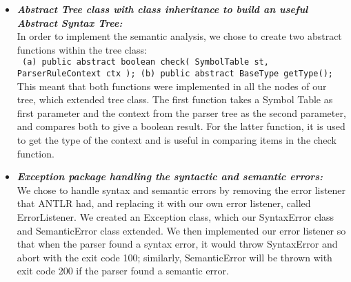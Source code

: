 \documentclass[a4paper]{article}
\theoremstyle{definition}
\begin{document}
\begin{itemize}
\item\textbf{\textit{Abstract Tree class with class inheritance to build an useful Abstract Syntax Tree:}}
\\
In order to implement the semantic analysis, we chose to create two abstract functions within the tree class:
\\
\texttt{\noindent
\phantom{3ex}(a) public abstract boolean check( SymbolTable st, ParserRuleContext ctx );
\newline\noindent
\phantom{3ex}(b) public abstract BaseType getType();
}
\\
This meant that both functions were implemented in all the nodes of our tree, which extended tree class. The first function takes a Symbol Table as first parameter and the context from the parser tree as the second parameter, and compares both to give a boolean result. For the latter function, it is used to get the type of the context and is useful in comparing items in the check function.
\end{itemize}

\begin{itemize}
\item\textbf{\textit{Exception package handling the syntactic and semantic errors:}}
\\
We chose to handle syntax and semantic errors by removing the error listener that ANTLR had, and replacing it with our own error listener, called ErrorListener. We created an Exception class, which our SyntaxError class and SemanticError class extended. We then implemented our error listener so that when the parser found a syntax error, it would throw SyntaxError and abort with the exit code 100; similarly, SemanticError will be thrown with exit code 200 if the parser found a semantic error.
\end{itemize}

\end{document}
